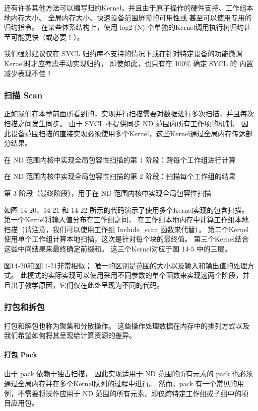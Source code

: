 还有许多其他方法可以编写归约Kernel，并且由于原子操作的硬件支持、工作组本地内存大小、
全局内存大小、快速设备范围屏障的可用性或 甚至可以使用专用的归约指令。 
在某些体系结构上，使用 log2 (N) 个单独的Kernel调用执行树归约甚至可能更快（或必要！）。

我们强烈建议仅在 SYCL 归约库不支持的情况下或在针对特定设备的功能微调Kernel时才应考虑手动实现归约，
即使如此，也只有在 100\% 确定 SYCL 的 内置减少表现不佳！

\subsubsection{扫描 Scan}
正如我们在本章前面所看到的，实现并行扫描需要对数据进行多次扫描，并且每次扫描之间发生同步。 
由于 SYCL 不提供同步 ND 范围内所有工作项的机制，
因此设备范围扫描的直接实现必须使用多个Kernel，这些Kernel通过全局内存传达部分结果。

{\color{red} 在 ND 范围内核中实现全局包容性扫描的第 1 阶段：跨每个工作组进行计算}

{\color{red} 在 ND 范围内核中实现全局包容性扫描的第 2 阶段：扫描每个工作组的结果}

{\color{red} 第 3 阶段（最终阶段），用于在 ND 范围内核中实现全局包容性扫描}

如图 14-20、14-21 和 14-22 所示的代码演示了使用多个Kernel实现的包含扫描。 
第一个Kernel将输入值分布在工作组之间，
在工作组本地内存中计算工作组本地扫描（请注意，我们可以使用工作组 Include\_scan 函数来代替）。 
第二个Kernel使用单个工作组计算本地扫描，这次是针对每个块的最终值。 
第三个Kernel结合这些中间结果来最终确定前缀和。 这三个Kernel对应于图 14-5 中的三层。

图14-20和图14-21非常相似； 唯一的区别是范围的大小以及输入和输出值的处理方式。 
此模式的实际实现可以使用采用不同参数的单个函数来实现这两个阶段，并且出于教学原因，它们仅在此处呈现为不同的代码。

\subsubsection{打包和拆包}
打包和解包也称为聚集和分散操作。 这些操作处理数据在内存中的排列方式以及我们希望如何将其呈现给计算资源的差异。

\paragraph{打包 Pack}

由于 pack 依赖于独占扫描，
因此实现适用于 ND 范围的所有元素的 pack 也必须通过全局内存并在多个Kernel队列的过程中进行。 
然而，pack 有一个常见的用例，不需要将操作应用于 ND 范围的所有元素，即仅跨特定工作组或子组中的项目应用包。

